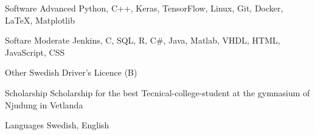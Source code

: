 

\begin{cvskills}

  \cvskill
    {Software Advanced} %
    {Python, C++, Keras, TensorFlow, Linux, Git, Docker, LaTeX, Matplotlib} %

  \cvskill
    {Softare Moderate} %
    {Jenkins, C, SQL, R, C\#, Java, Matlab, VHDL, HTML, JavaScript, CSS} %

  \cvskill
    {Other} %
    {Swedish Driver's Licence (B)} %

  \cvskill
    {Scholarship} %
    {Scholarship for the best Tecnical-college-student at the
    gymnasium of Njudung in Vetlanda} %

  \cvskill
    {Languages} %
    {Swedish, English} %

\end{cvskills}
